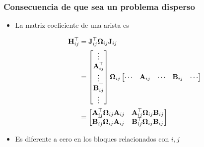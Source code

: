 \begin{frame}
    \frametitle{Consecuencia de que sea un problema disperso}
    
    \begin{itemize}
        \item La matriz coeficiente de una arista es

        \begin{align*}
            \boldsymbol{\mathbf{H}}_{ij}^{\top} &= \boldsymbol{\mathbf{J}}_{ij}^{\top}\boldsymbol{\mathbf{\Omega}}_{ij}\boldsymbol{\mathbf{J}}_{ij}\\
            &= 
            \begin{bmatrix}
                \vdots \\
                \boldsymbol{\mathbf{A}}_{ij}^{\top}\\
                \vdots \\
                \boldsymbol{\mathbf{B}}_{ij}^{\top}\\
                \vdots
            \end{bmatrix} \boldsymbol{\mathbf{\Omega}}_{ij}
            \begin{bmatrix}
                \cdots & \boldsymbol{\mathbf{A}}_{ij} & \cdots & \boldsymbol{\mathbf{B}}_{ij} & \cdots
            \end{bmatrix}\\
            &= 
            \begin{bmatrix}
                \boldsymbol{\mathbf{A}}_{ij}^{\top}\boldsymbol{\mathbf{\Omega}}_{ij}\boldsymbol{\mathbf{A}}_{ij} & \boldsymbol{\mathbf{A}}_{ij}^{\top}\boldsymbol{\mathbf{\Omega}}_{ij}\boldsymbol{\mathbf{B}}_{ij}\\
                \boldsymbol{\mathbf{B}}_{ij}^{\top}\boldsymbol{\mathbf{\Omega}}_{ij}\boldsymbol{\mathbf{A}}_{ij} & \boldsymbol{\mathbf{B}}_{ij}^{\top}\boldsymbol{\mathbf{\Omega}}_{ij}\boldsymbol{\mathbf{B}}_{ij}
            \end{bmatrix}
        \end{align*}
        \item Es diferente a cero en los bloques relacionados con $i,j$
    \end{itemize}
    
\end{frame}


